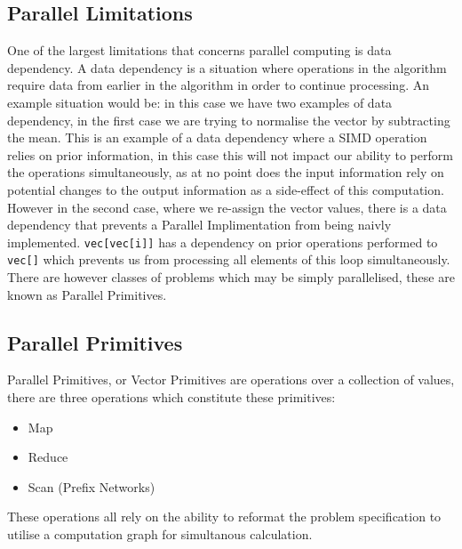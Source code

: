 \subsection{Parallel Limitations} 
One of the largest limitations that concerns parallel computing is data dependency. A data
dependency is a situation where operations in the algorithm require data from earlier in the
algorithm in order to continue processing. An example situation would be:
 in this case we have two examples of data dependency, in
the first case we are trying to normalise the vector by subtracting the mean. This is an example of
a data dependency where a SIMD operation relies on prior information, in this case this will not
impact our ability to perform the operations simultaneously, as at no point does the input
information rely on potential changes to the output information as a side-effect of this
computation. However in the second case, where we re-assign the vector values, there is a data
dependency that prevents a Parallel Implimentation from being naivly implemented.
\lstinline{vec[vec[i]]} has a dependency on prior operations performed to \lstinline{vec[]} which
prevents us from processing all elements of this loop simultaneously. There are however classes of
problems which may be simply parallelised, these are known as Parallel Primitives.

\subsection{Parallel Primitives}
Parallel Primitives, or Vector Primitives are operations over a collection of values, there are
three operations which constitute these primitives:
\begin{itemize}
    \item Map
    \item Reduce
    \item Scan (Prefix Networks)
\end{itemize}
These operations all rely on the ability to reformat the problem specification to utilise a
computation graph for simultanous calculation.


